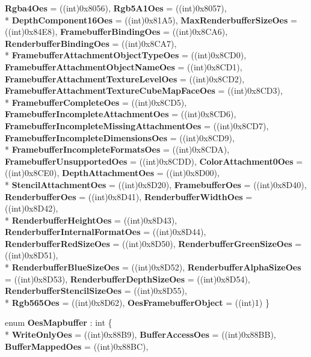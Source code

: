 \begin{DoxyCompactItemize}
{\bfseries Rgba4\-Oes} = ((int)0x8056), 
{\bfseries Rgb5\-A1\-Oes} = ((int)0x8057), 
\\*
{\bfseries Depth\-Component16\-Oes} = ((int)0x81\-A5), 
{\bfseries Max\-Renderbuffer\-Size\-Oes} = ((int)0x84\-E8), 
{\bfseries Framebuffer\-Binding\-Oes} = ((int)0x8\-C\-A6), 
{\bfseries Renderbuffer\-Binding\-Oes} = ((int)0x8\-C\-A7), 
\\*
{\bfseries Framebuffer\-Attachment\-Object\-Type\-Oes} = ((int)0x8\-C\-D0), 
{\bfseries Framebuffer\-Attachment\-Object\-Name\-Oes} = ((int)0x8\-C\-D1), 
{\bfseries Framebuffer\-Attachment\-Texture\-Level\-Oes} = ((int)0x8\-C\-D2), 
{\bfseries Framebuffer\-Attachment\-Texture\-Cube\-Map\-Face\-Oes} = ((int)0x8\-C\-D3), 
\\*
{\bfseries Framebuffer\-Complete\-Oes} = ((int)0x8\-C\-D5), 
{\bfseries Framebuffer\-Incomplete\-Attachment\-Oes} = ((int)0x8\-C\-D6), 
{\bfseries Framebuffer\-Incomplete\-Missing\-Attachment\-Oes} = ((int)0x8\-C\-D7), 
{\bfseries Framebuffer\-Incomplete\-Dimensions\-Oes} = ((int)0x8\-C\-D9), 
\\*
{\bfseries Framebuffer\-Incomplete\-Formats\-Oes} = ((int)0x8\-C\-D\-A), 
{\bfseries Framebuffer\-Unsupported\-Oes} = ((int)0x8\-C\-D\-D), 
{\bfseries Color\-Attachment0\-Oes} = ((int)0x8\-C\-E0), 
{\bfseries Depth\-Attachment\-Oes} = ((int)0x8\-D00), 
\\*
{\bfseries Stencil\-Attachment\-Oes} = ((int)0x8\-D20), 
{\bfseries Framebuffer\-Oes} = ((int)0x8\-D40), 
{\bfseries Renderbuffer\-Oes} = ((int)0x8\-D41), 
{\bfseries Renderbuffer\-Width\-Oes} = ((int)0x8\-D42), 
\\*
{\bfseries Renderbuffer\-Height\-Oes} = ((int)0x8\-D43), 
{\bfseries Renderbuffer\-Internal\-Format\-Oes} = ((int)0x8\-D44), 
{\bfseries Renderbuffer\-Red\-Size\-Oes} = ((int)0x8\-D50), 
{\bfseries Renderbuffer\-Green\-Size\-Oes} = ((int)0x8\-D51), 
\\*
{\bfseries Renderbuffer\-Blue\-Size\-Oes} = ((int)0x8\-D52), 
{\bfseries Renderbuffer\-Alpha\-Size\-Oes} = ((int)0x8\-D53), 
{\bfseries Renderbuffer\-Depth\-Size\-Oes} = ((int)0x8\-D54), 
{\bfseries Renderbuffer\-Stencil\-Size\-Oes} = ((int)0x8\-D55), 
\\*
{\bfseries Rgb565\-Oes} = ((int)0x8\-D62), 
{\bfseries Oes\-Framebuffer\-Object} = ((int)1)
 \}
\item 
enum {\bfseries Oes\-Mapbuffer} \-: int \{ \\*
{\bfseries Write\-Only\-Oes} = ((int)0x88\-B9), 
{\bfseries Buffer\-Access\-Oes} = ((int)0x88\-B\-B), 
{\bfseries Buffer\-Mapped\-Oes} = ((int)0x88\-B\-C), 

\end{DoxyCompactItemize}
